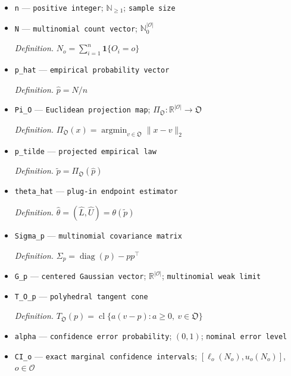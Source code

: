 \documentclass{article}
\begin{document}
\begin{itemize}
  \par\smallskip\noindent\emph{Definition.} \(\theta(p)=(L(p),U(p))\)
  \item \texttt{n} --- \texttt{positive integer}; \(\mathbb N_{\ge1}\); \texttt{sample size}
  \item \texttt{N} --- \texttt{multinomial count vector}; \(\mathbb N_0^{|\mathcal O|}\)
  \par\smallskip\noindent\emph{Definition.} \(N_o=\sum_{i=1}^n\mathbf 1\{O_i=o\}\)
  \item \texttt{p\_\allowbreak{}hat} --- \texttt{empirical probability vector}
  \par\smallskip\noindent\emph{Definition.} \(\widehat p=N/n\)
  \item \texttt{Pi\_\allowbreak{}O} --- \texttt{Euclidean projection map}; \(\Pi_{\mathfrak O}:\mathbb R^{|\mathcal O|}\to\mathfrak O\)
  \par\smallskip\noindent\emph{Definition.} \(\Pi_{\mathfrak O}(x)=\operatorname*{argmin}_{v\in\mathfrak O}\|x-v\|_2\)
  \item \texttt{p\_\allowbreak{}tilde} --- \texttt{projected empirical law}
  \par\smallskip\noindent\emph{Definition.} \(\widetilde p=\Pi_{\mathfrak O}(\widehat p)\)
  \item \texttt{theta\_\allowbreak{}hat} --- \texttt{plug-\allowbreak{}in endpoint estimator}
  \par\smallskip\noindent\emph{Definition.} \(\widehat\theta=(\widehat L,\widehat U)=\theta(\widetilde p)\)
  \item \texttt{Sigma\_\allowbreak{}p} --- \texttt{multinomial covariance matrix}
  \par\smallskip\noindent\emph{Definition.} \(\Sigma_p=\operatorname{diag}(p)-pp^{\top}\)
  \item \texttt{G\_\allowbreak{}p} --- \texttt{centered Gaussian vector}; \(\mathbb R^{|\mathcal O|}\); \texttt{multinomial weak limit}
  \item \texttt{T\_\allowbreak{}O\_\allowbreak{}p} --- \texttt{polyhedral tangent cone}
  \par\smallskip\noindent\emph{Definition.} \(T_{\mathfrak O}(p)=\operatorname{cl}\{a(v-p):a\ge0,\ v\in\mathfrak O\}\)
  \item \texttt{alpha} --- \texttt{confidence error probability}; \((0,1)\); \texttt{nominal error level}
  \item \texttt{CI\_\allowbreak{}o} --- \texttt{exact marginal confidence intervals}; \([\ell_o(N_o),u_o(N_o)]\), \(o\in\mathcal O\)

\end{itemize}
\end{document}
